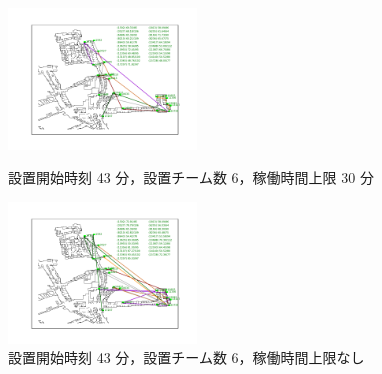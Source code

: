 \documentclass[a4paper,12pt,fleqn]{jarticle}
\begin{document}
\begin{figure}
 \begin{center}
  \begin{minipage}{0.49\hsize}
   \begin{center}
    \includegraphics[width=5cm,trim=100 50 100 50]{fig/43min_6team_lim30min.pdf}
    \caption{設置開始時刻 43 分，\newline \quad 設置チーム数 6，稼働時間上限 30 分}
    \label{fig:43min_6team_lim30min}
   \end{center}
  \end{minipage}
  \begin{minipage}{0.49\hsize}
   \begin{center}
    \includegraphics[width=5cm,trim=100 50 100 50]{fig/43min_6team_nolim.pdf}
    \caption{設置開始時刻 43 分，\newline \quad 設置チーム数 6，稼働時間上限なし}
    \label{fig:43min_6team_nolim}
   \end{center}
  \end{minipage}
 \end{center}
\end{figure}
\end{document}
